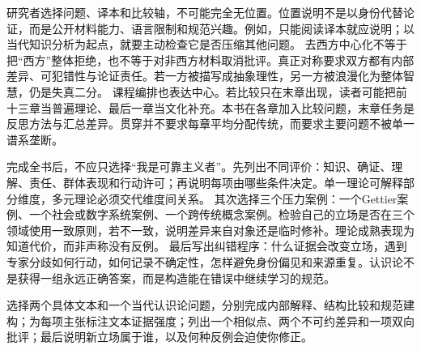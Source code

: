 研究者选择问题、译本和比较轴，不可能完全无位置。位置说明不是以身份代替论证，而是公开材料能力、语言限制和规范兴趣。例如，只能阅读译本就应说明；以当代知识分析为起点，就要主动检查它是否压缩其他问题。 去西方中心化不等于把“西方”整体拒绝，也不等于对非西方材料取消批评。真正对称要求双方都有内部差异、可犯错性与论证责任。若一方被描写成抽象理性，另一方被浪漫化为整体智慧，仍是失真二分。 课程编排也表达中心。若比较只在末章出现，读者可能把前十三章当普遍理论、最后一章当文化补充。本书在各章加入比较问题，末章任务是反思方法与汇总差异。贯穿并不要求每章平均分配传统，而要求主要问题不被单一谱系垄断。

完成全书后，不应只选择“我是可靠主义者”。先列出不同评价：知识、确证、理解、责任、群体表现和行动许可；再说明每项由哪些条件决定。单一理论可解释部分维度，多元理论必须交代维度间关系。 其次选择三个压力案例：一个Gettier案例、一个社会或数字系统案例、一个跨传统概念案例。检验自己的立场是否在三个领域使用一致原则，若不一致，说明差异来自对象还是临时修补。理论成熟表现为知道代价，而非声称没有反例。 最后写出纠错程序：什么证据会改变立场，遇到专家分歧如何行动，如何记录不确定性，怎样避免身份偏见和来源重复。认识论不是获得一组永远正确答案，而是构造能在错误中继续学习的规范。

\begin{tcolorbox}[breakable,colback=white,colframe=blue!30!black,title={结课研读任务},fonttitle=\bfseries]
选择两个具体文本和一个当代认识论问题，分别完成内部解释、结构比较和规范建构；为每项主张标注文本证据强度；列出一个相似点、两个不可约差异和一项双向批评；最后说明新立场属于谁，以及何种反例会迫使你修正。
\end{tcolorbox}
